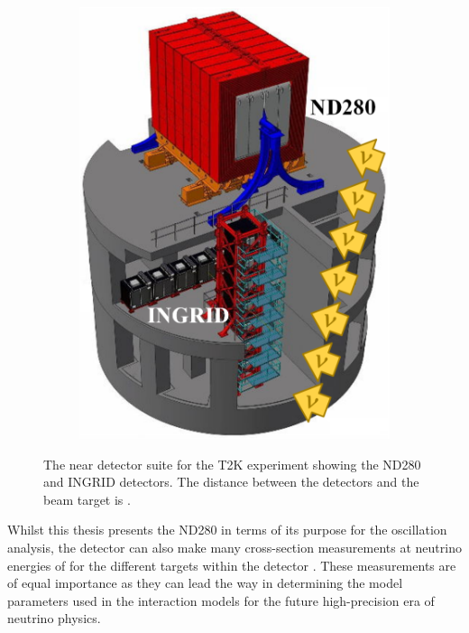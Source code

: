 \begin{figure}[h]
  \begin{subfigure}[t]{0.5\textwidth}
    \includegraphics[width=\textwidth, trim={0mm 0mm 0mm 0mm}, clip,page=1]{Figures/Detectors/T2KND280Hall.pdf}
  \end{subfigure}
  \caption{The near detector suite for the T2K experiment showing the ND280 and INGRID detectors. The distance between the detectors and the beam target is .}
  \label{fig:T2KSKExp_T2K_ND280Pit}
\end{figure}

Whilst this thesis presents the ND280 in terms of its purpose for the oscillation analysis, the detector can also make many cross-section measurements at neutrino energies of  for the different targets within the detector \cite{PhysRevD.102.012007,10.1093/ptep/ptab014}. These measurements are of equal importance as they can lead the way in determining the model parameters used in the interaction models for the future high-precision era of neutrino physics.

